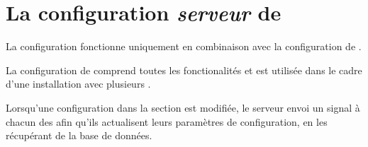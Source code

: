\section{La configuration \emph{serveur} de \yeren}
La configuration  fonctionne uniquement en
combinaison avec la configuration  de \yeren.

La configuration  de \yeren comprend
toutes les fonctionalit\'es et est utilis\'ee dans
le cadre d'une installation avec plusieurs .

Lorsqu'une configuration dans la section  est modifi\'ee, le serveur envoi
un signal \`a chacun des  afin qu'ils
actualisent leurs param\`etres de configuration, en
les r\'ecup\'erant de la base de donn\'ees.
